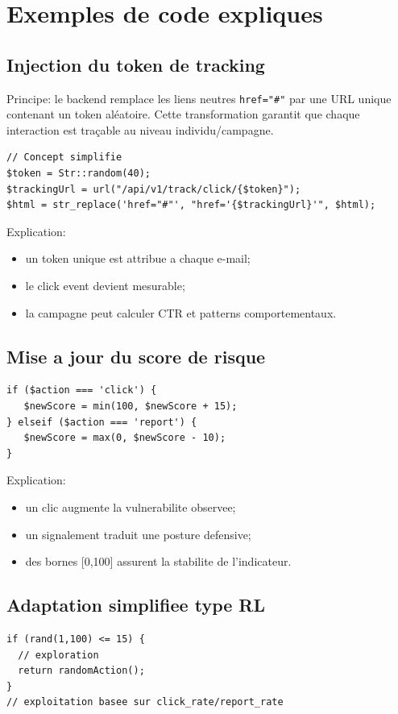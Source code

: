 \documentclass[12pt,a4paper,oneside]{report}
\begin{document}
\section{Exemples de code expliques}
\subsection{Injection du token de tracking}
Principe: le backend remplace les liens neutres \texttt{href="\#"} par une URL unique contenant un token aléatoire. Cette transformation garantit que chaque interaction est traçable au niveau individu/campagne.

\begin{lstlisting}
// Concept simplifie
$token = Str::random(40);
$trackingUrl = url("/api/v1/track/click/{$token}");
$html = str_replace('href="#"', "href='{$trackingUrl}'", $html);
\end{lstlisting}

Explication:
\begin{itemize}[leftmargin=1.2cm]
  \item un token unique est attribue a chaque e-mail;
  \item le click event devient mesurable;
  \item la campagne peut calculer CTR et patterns comportementaux.
\end{itemize}

\subsection{Mise a jour du score de risque}
\begin{lstlisting}
if ($action === 'click') {
   $newScore = min(100, $newScore + 15);
} elseif ($action === 'report') {
   $newScore = max(0, $newScore - 10);
}
\end{lstlisting}

Explication:
\begin{itemize}[leftmargin=1.2cm]
  \item un clic augmente la vulnerabilite observee;
  \item un signalement traduit une posture defensive;
  \item des bornes [0,100] assurent la stabilite de l'indicateur.
\end{itemize}

\subsection{Adaptation simplifiee type RL}
\begin{lstlisting}
if (rand(1,100) <= 15) {
  // exploration
  return randomAction();
}
// exploitation basee sur click_rate/report_rate
\end{lstlisting}
\end{document}

